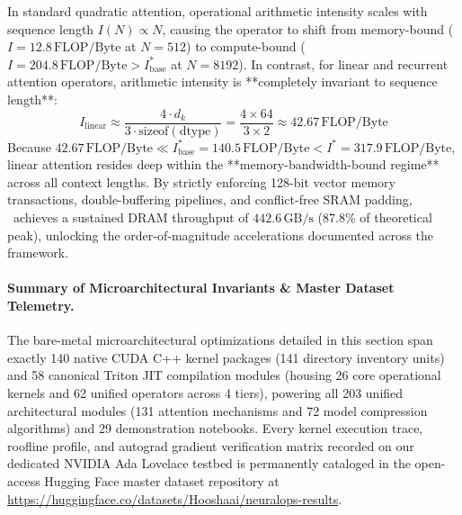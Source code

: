 In standard quadratic attention, operational arithmetic intensity scales with sequence length $I(N) \propto N$, causing the operator to shift from memory-bound ($I=12.8\,\text{FLOP/Byte}$ at $N=512$) to compute-bound ($I=204.8\,\text{FLOP/Byte} > I^*_{\text{base}}$ at $N=8192$). In contrast, for linear and recurrent attention operators, arithmetic intensity is **completely invariant to sequence length**:
\begin{equation}
\label{eq:linear_intensity_invariance}
I_{\text{linear}} \approx \frac{4 \cdot d_k}{3 \cdot \text{sizeof}(\text{dtype})} = \frac{4 \times 64}{3 \times 2} \approx 42.67\,\text{FLOP/Byte}
\end{equation}
Because $42.67\,\text{FLOP/Byte} \ll I^*_{\text{base}} = 140.5\,\text{FLOP/Byte} < I^* = 317.9\,\text{FLOP/Byte}$, linear attention resides deep within the **memory-bandwidth-bound regime** across all context lengths. By strictly enforcing 128-bit vector memory transactions, double-buffering pipelines, and conflict-free SRAM padding, \neuralops\ achieves a sustained DRAM throughput of $442.6\,\text{GB/s}$ ($87.8\%$ of theoretical peak), unlocking the order-of-magnitude accelerations documented across the framework.

\paragraph{Summary of Microarchitectural Invariants \& Master Dataset Telemetry.}
The bare-metal microarchitectural optimizations detailed in this section span exactly 140 native CUDA C++ kernel packages (141 directory inventory units) and 58 canonical Triton JIT compilation modules (housing 26 core operational kernels and 62 unified operators across 4 tiers), powering all 203 unified architectural modules (131 attention mechanisms and 72 model compression algorithms) and 29 demonstration notebooks. Every kernel execution trace, roofline profile, and autograd gradient verification matrix recorded on our dedicated NVIDIA Ada Lovelace testbed is permanently cataloged in the open-access Hugging Face master dataset repository at \url{https://huggingface.co/datasets/Hooshaai/neuralops-results}.

